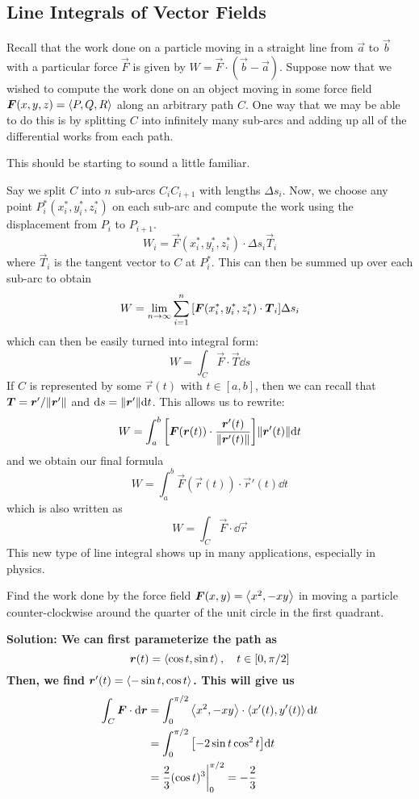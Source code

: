\subsection{Line Integrals of Vector Fields}
Recall that the work done on a particle moving in a straight line from $\vec a$ to $\vec b$ with a particular force $\vec F$ is given by $W = \vec F \cdot (\vec b - \vec a)$. Suppose now that we wished to compute the work done on an object moving in some force field $\boldsymbol{F}(x,y,z) = \left\langle P,Q,R\right\rangle$ along an arbitrary path $C$. One way that we may be able to do this is by splitting $C$ into infinitely many sub-arcs and adding up all of the differential works from each path. \par
This should be starting to sound a little familiar. \par
Say we split $C$ into $n$ sub-arcs $C_{i}C_{i+1}$ with lengths $\Delta s_i$. Now, we choose any point $P_i^*(x_i^*, y_i^*, z_i^*)$ on each sub-arc and compute the work using the displacement from $P_{i}$ to $P_{i+1}$. 
\[ W_i = \vec F(x_i^*, y_i^*, z_i^*) \cdot \Delta s_i \vec T_i\]
where $\vec T_i$ is the tangent vector to $C$ at $P_i^*$.
This can then be summed up over each sub-arc to obtain
\[ W = \lim_{n\to\infty} \sum_{i=1}^n \bqty{\vec F(x_i^*, y_i^*, z_i^*)\cdot \vec T_i}\Delta s_i \]
which can then be easily turned into integral form:
\[ W = \int_C \vec F \cdot \vec T \dd s\]
If $C$ is represented by some $\vec r(t)$ with $t\in[a,b]$, then we can recall that $\boldsymbol{T} = \boldsymbol{r}'/\norm{\boldsymbol{r}'}$ and $\dd s = \norm{\boldsymbol{r}'}\dd t$. This allows us to rewrite: 
\[ W = \int_a^b \bqty{\vec F(\vec r(t)) \cdot \frac{\vec r'(t)}{\norm{\vec r'(t)}}} \norm{\vec r'(t)}\dd t\]
and we obtain our final formula
\[ W = \int_a^b \vec F(\vec r(t))\cdot \vec r'(t) \dd t\]
which is also written as
\[ W = \int_C \vec F \cdot \dd \vec r\]
This new type of line integral shows up in many applications, especially in physics. 
\begin{example}
    Find the work done by the force field $\boldsymbol{F}(x,y) = \left\langle x^2, -xy\right\rangle$ in moving a particle counter-clockwise around the quarter of the unit circle in the first quadrant.
    \par\bf{Solution: }We can first parameterize the path as
    \[ \boldsymbol{r}(t) = \left\langle \cos t, \sin t\right\rangle, \quad t\in[0, \pi/2]\]
    Then, we find $\boldsymbol{r}'(t) = \left\langle-\sin t, \cos t\right\rangle$. This will give us
    \begin{align*}
        \int_C\vec F \cdot \dd \vec r &= \int_0^{\pi/2}\<x^2, -xy\>\cdot \<x'(t), y'(t)\>\dd t \\
        &= \int_0^{\pi/2}\bqty{-2\sin t\cos^2t }\dd t \\
        &= \frac{2}{3}(\cos t)^3\biggr|_0^{\pi/2} = -\frac{2}{3}
    \end{align*}
\end{example}
